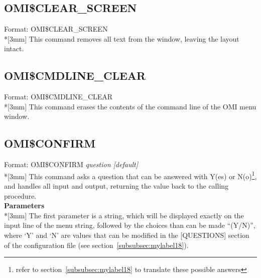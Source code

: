 \documentclass[a4paper]{book}
\renewcommand{\indent}{\hspace*{5mm}}
\begin{document}
\subsection{OMI{\$}CLEAR{\_}SCREEN}

\indent Format: \textsf{OMI{\$}CLEAR{\_}SCREEN}\\*[3mm]
This command removes all text from the window, leaving the layout intact.

\subsection{OMI{\$}CMDLINE{\_}CLEAR}
\label{subsubsec:mylabel45}

\indent Format: \textsf{OMI{\$}CMDLINE{\_}CLEAR}\\*[3mm]
This command erases the contents of the command line of the OMI menu window.

\subsection{OMI{\$}CONFIRM}
\label{subsubsec:mylabel46}

\indent Format: \textsf{OMI{\$}CONFIRM} \textit{question [default]}\\*[3mm]
This command asks a question that can be answered with Y(es) or N(o)\footnote{ refer
to section~\ref{subsubsec:mylabel18} to translate these possible answers}, and 
handles all input and output, returning the value back to the calling 
procedure.\\[3mm]
\textbf{Parameters}\\*[3mm]
The first parameter is a string, which will be displayed exactly on the 
input line of the menu string, followed by the choices than can be made 
``(Y/N)'', where `Y' and `N' are values that can
be modified in the [QUESTIONS] section of the configuration file (see section~\ref{subsubsec:mylabel18}).
\end{document}
